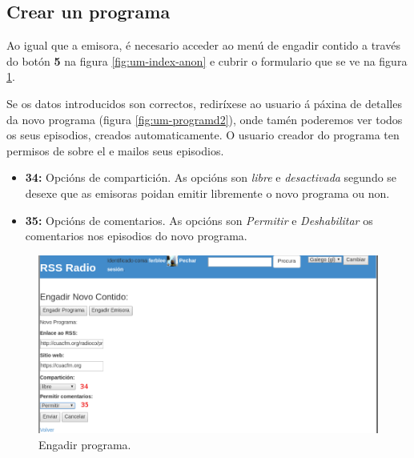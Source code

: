 \subsection{Crear un programa}

Ao igual que a emisora, é necesario acceder ao menú de engadir contido a través do botón \textbf{5} na figura \ref{fig:um-index-anon} e cubrir o formulario que se ve na figura \ref{fig:um-add-program}.

Se os datos introducidos son correctos, rediríxese ao usuario á páxina de detalles da novo programa (figura \ref{fig:um-programd2}), onde tamén poderemos ver todos os seus episodios, creados automaticamente. O usuario creador do programa ten permisos de  sobre el e mailos seus episodios.

\begin{itemize}
	\item \textbf{34:} Opcións de compartición. As opcións son \textit{libre} e \textit{desactivada} segundo se desexe que as emisoras poidan emitir libremente o novo programa ou non.  
	\item \textbf{35:} Opcións de comentarios. As opcións son \textit{Permitir} e \textit{Deshabilitar} os comentarios nos episodios do novo programa.
\end{itemize}


\begin{figure}[H]
	\centering
	\includegraphics[scale=0.43,keepaspectratio=true]{./images/usermanual/um-add-program.png}
	\caption{Engadir programa.}
	\label{fig:um-add-program}
\end{figure}

